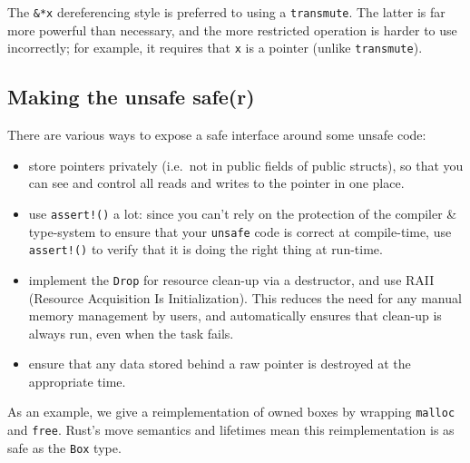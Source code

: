\documentclass[]{article}
\begin{document}
The \texttt{\&*x} dereferencing style is preferred to using a
\texttt{transmute}. The latter is far more powerful than necessary, and
the more restricted operation is harder to use incorrectly; for example,
it requires that \texttt{x} is a pointer (unlike \texttt{transmute}).

\subsection{Making the unsafe safe(r)}\label{making-the-unsafe-safer}

There are various ways to expose a safe interface around some unsafe
code:

\begin{itemize}
\itemsep1pt\parskip0pt
\item
  store pointers privately (i.e.~not in public fields of public
  structs), so that you can see and control all reads and writes to the
  pointer in one place.
\item
  use \texttt{assert!()} a lot: since you can't rely on the protection
  of the compiler \& type-system to ensure that your \texttt{unsafe}
  code is correct at compile-time, use \texttt{assert!()} to verify that
  it is doing the right thing at run-time.
\item
  implement the \texttt{Drop} for resource clean-up via a destructor,
  and use RAII (Resource Acquisition Is Initialization). This reduces
  the need for any manual memory management by users, and automatically
  ensures that clean-up is always run, even when the task fails.
\item
  ensure that any data stored behind a raw pointer is destroyed at the
  appropriate time.
\end{itemize}

As an example, we give a reimplementation of owned boxes by wrapping
\texttt{malloc} and \texttt{free}. Rust's move semantics and lifetimes
mean this reimplementation is as safe as the \texttt{Box} type.
\end{document}
